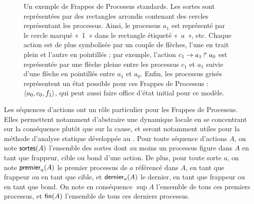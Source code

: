 \begin{example}
  \begin{figure}[ht]
  \begin{center}
  \caption{%
    Un exemple de Frappes de Processus standards.
    Les sortes sont représentées par des rectangles arrondis 
    contenant des cercles représentant les processus.
    Ainsi, le processus $a_1$ est représenté par le cercle marqué «~1~»
    dans le rectangle étiqueté «~$a$~», etc.
    Chaque action est de plus symbolisée par un couple de flèches,
    l'une en trait plein et l'autre en pointillés ;
    par exemple, l'action $c_1\rightarrow a_1\Rsh a_0$
    est représentée par une flèche pleine entre les processus $c_1$ et $a_1$
    suivie d'une flèche en pointillés entre $a_1$ et $a_0$.
    Enfin, les processus grisés représentent un état possible
    pour ces Frappes de Processus : $\mbox{$\langle a_0, c_0, f_1 \rangle$}$, qui peut aussi faire office
    d'état initial pour ce modèle.
  }
  \end{center}
  \end{figure}
\end{example}

Les séquences d'actions ont un rôle particulier pour les Frappes de Processus.
Elles permettent notamment d'abstraire une dynamique locale en se concentrant
sur la conséquence plutôt que sur la cause,
et seront notamment utiles pour la méthode d'analyse statique développée
au .
Pour toute séquence d'actions $A$,
on note $\mathsf{sortes}(A)$ l'ensemble des sortes dont au moins un processus figure dans $A$
en tant que frappeur, cible ou bond d'une action.
De plus, pour toute sorte $a$,
on note $\mathsf{premier}_{a}(A)$ le premier processus de $a$ référencé dans $A$,
en tant que frappeur ou en tant que cible,
et $\mathsf{dernier}_{a}(A)$ le dernier, en tant que frappeur ou en tant que bond.
On note en conséquence
$\sup{A}$ l'ensemble de tous ces premiers processus,
et $\mathsf{fin}(A)$ l'ensemble de tous ces derniers processus.


